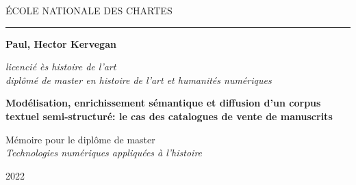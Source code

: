 \documentclass[a4paper,12pt,twoside]{book}
\newcommand{\cleartwopages}{%
	\afterpage{
		\pagestyle{empty}
		\newpage~\newpage~\newpage~
	}
}
\begin{document}
	\onehalfspacing
	
	\begin{titlepage}
		\begin{center}		
			\bigskip
			
			\begin{large}
				ÉCOLE NATIONALE DES CHARTES\\
			\end{large}
			
			\rule{2cm}{0.02cm}
			
			\bigskip
			
			\begin{Large}
				\textbf{Paul, Hector Kervegan}
			\end{Large}
		
			\bigskip
		
			\begin{normalsize} 
				\textit{licencié ès histoire de l'art}\\
				\textit{diplômé de master en histoire de l'art et humanités numériques}
			\end{normalsize}
			
			\vfill
			
			\begin{Huge}
				\textbf{
					Modélisation, enrichissement sémantique et diffusion d'un corpus textuel
					semi-structuré: le cas des catalogues de vente de manuscrits
				}
			\end{Huge}
			
			\vfill
			
			\begin{large}
				Mémoire pour le diplôme de master \\
				\emph{Technologies numériques appliquées à l'histoire}
				
				\bigskip
				
				2022
			\end{large}
			
		\end{center}
	\end{titlepage}














\cleartwopages
\end{document}
